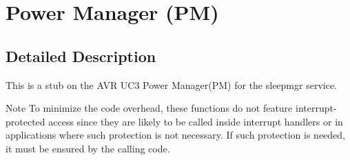 \hypertarget{group__sleep__group}{
\section{\-Power \-Manager (\-P\-M)}
\label{group__sleep__group}
}


\subsection{\-Detailed \-Description}
\-This is a stub on the \-A\-V\-R \-U\-C3 \-Power \-Manager(\-P\-M) for the sleepmgr service.

\begin{DoxyNote}{\-Note}
\-To minimize the code overhead, these functions do not feature interrupt-\/protected access since they are likely to be called inside interrupt handlers or in applications where such protection is not necessary. \-If such protection is needed, it must be ensured by the calling code. 
\end{DoxyNote}
